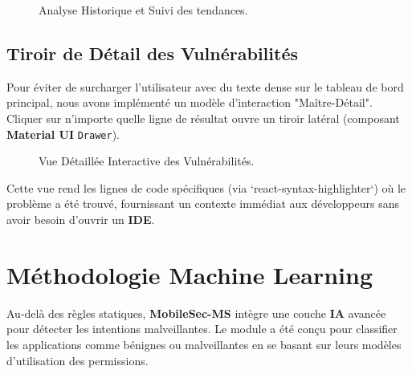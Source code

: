 \documentclass[
  journal=largetwo,
  manuscript=article-type,
  year=2025,
  volume=1,
]{cup-journal}
\begin{document}
\begin{figure}
\centering
{}
\caption{Analyse Historique et Suivi des tendances.}
\label{fig:history}
\end{figure}

\subsection{Tiroir de Détail des Vulnérabilités}
Pour éviter de surcharger l'utilisateur avec du texte dense sur le tableau de bord principal, nous avons implémenté un modèle d'interaction "Maître-Détail". Cliquer sur n'importe quelle ligne de résultat ouvre un tiroir latéral (composant \textbf{Material UI} \texttt{Drawer}).

\begin{figure}
\centering
{}
\caption{Vue Détaillée Interactive des Vulnérabilités.}
\label{fig:vuln_drawer}
\end{figure}

Cette vue rend les lignes de code spécifiques (via `react-syntax-highlighter`) où le problème a été trouvé, fournissant un contexte immédiat aux développeurs sans avoir besoin d'ouvrir un \textbf{IDE}.

\section{Méthodologie Machine Learning}
\label{sec:ml}

Au-delà des règles statiques, \textbf{MobileSec-MS} intègre une couche \textbf{IA} avancée pour détecter les intentions malveillantes. Le module a été conçu pour classifier les applications comme bénignes ou malveillantes en se basant sur leurs modèles d'utilisation des permissions.
\end{document}
